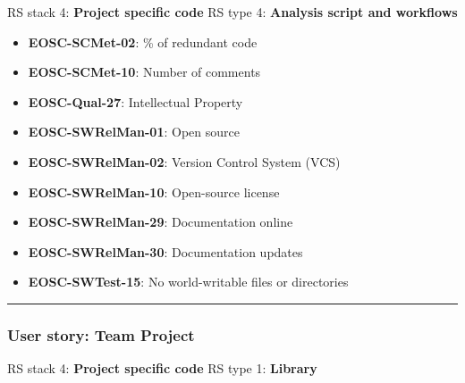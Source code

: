 RS stack 4: \textbf{Project specific code} \newline
RS type 4: \textbf{Analysis script and workflows}

\begin{itemize}
    \item \textbf{EOSC-SCMet-02}: \% of redundant code
    \item \textbf{EOSC-SCMet-10}: Number of comments
    \item \textbf{EOSC-Qual-27}: Intellectual Property
    \item \textbf{EOSC-SWRelMan-01}: Open source
    \item \textbf{EOSC-SWRelMan-02}: Version Control System (VCS)
    \item \textbf{EOSC-SWRelMan-10}: Open-source license
    \item \textbf{EOSC-SWRelMan-29}: Documentation online
    \item \textbf{EOSC-SWRelMan-30}: Documentation updates
    \item \textbf{EOSC-SWTest-15}: No world-writable files or directories
\end{itemize}
\hrule

\subsubsection{User story: Team Project}

RS stack 4: \textbf{Project specific code} \newline
RS type 1: \textbf{Library}

